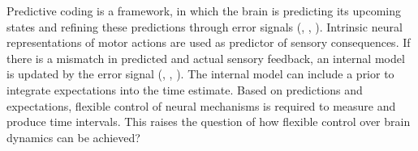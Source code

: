 \documentclass[10pt]{article}
\begin{document}
Predictive coding is a framework, in which the brain is predicting its upcoming states and refining these predictions through error signals (\cite{Ficco2021}, \cite{Huang2011}, \cite{Rao1999}).
Intrinsic neural representations of motor actions are used as predictor of sensory consequences. %
If there is a mismatch in predicted and actual sensory feedback, an internal model is updated by the error signal (\cite{Straka2018}, \cite{Clark2013}, \cite{Bubic2010}). %
The internal model can include a prior to integrate expectations into the time estimate.
Based on predictions and expectations, flexible control of neural mechanisms is required to measure and produce time intervals.
This raises the question of how flexible control over brain dynamics can be achieved? 

\end{document}
